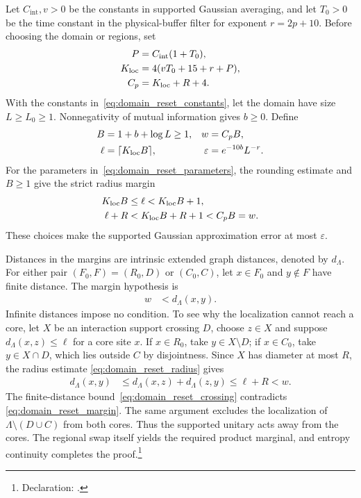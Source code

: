 \documentclass{article}
\begin{document}
Let $C_{\mathrm{int}},v>0$ be the constants in supported Gaussian averaging,
and let $T_0>0$ be the time constant in the physical-buffer filter for exponent
$r=2p+10$. Before choosing the domain or regions, set
\begin{align}
    P &= C_{\mathrm{int}}(1+T_0), \notag\\
    K_{\mathrm{loc}} &= 4(vT_0+15+r+P), \notag\\
    C_p &= K_{\mathrm{loc}}+R+4.
    \label{eq:domain_reset_constants}
\end{align}
With the constants in~\eqref{eq:domain_reset_constants}, let the domain have
size $L\ge L_0\ge1$. Nonnegativity of mutual information gives $b\ge0$. Define
\begin{align}
    B &= 1+b+\log L\ge1, & w &= C_p B, \notag\\
    \ell &= \lceil K_{\mathrm{loc}}B\rceil,
    & \varepsilon &= e^{-10b}L^{-r}.
    \label{eq:domain_reset_parameters}
\end{align}
For the parameters in~\eqref{eq:domain_reset_parameters}, the rounding
estimate and $B\ge1$ give the strict radius margin
\begin{align}
    K_{\mathrm{loc}}B &\le\ell<K_{\mathrm{loc}}B+1, \notag\\
    \ell+R &<K_{\mathrm{loc}}B+R+1<C_p B=w.
    \label{eq:domain_reset_radius}
\end{align}
These choices make the supported Gaussian approximation error at most
$\varepsilon$.

Distances in the margins are intrinsic extended graph distances, denoted by
$d_\Lambda$. For either pair $(F_0,F)=(R_0,D)$ or $(C_0,C)$, let $x\in F_0$
and $y\notin F$ have finite distance. The margin hypothesis is
\begin{align}
    w &<d_\Lambda(x,y).
    \label{eq:domain_reset_margin}
\end{align}
Infinite distances impose no condition. To see why the localization cannot
reach a core, let $X$ be an interaction support crossing $D$, choose $z\in X$
and suppose $d_\Lambda(x,z)\le\ell$ for a core site $x$. If $x\in R_0$, take
$y\in X\setminus D$; if $x\in C_0$, take $y\in X\cap D$, which lies outside
$C$ by disjointness. Since $X$ has diameter at most $R$, the radius estimate
\eqref{eq:domain_reset_radius} gives
\begin{align}
    d_\Lambda(x,y)
    &\le d_\Lambda(x,z)+d_\Lambda(z,y)
    \le\ell+R<w.
    \label{eq:domain_reset_crossing}
\end{align}
The finite-distance bound~\eqref{eq:domain_reset_crossing} contradicts
\eqref{eq:domain_reset_margin}. The same argument excludes the localization
of $\Lambda\setminus(D\cup C)$ from both cores. Thus the supported unitary
acts away from the cores. The regional swap itself yields the required
product marginal, and entropy continuity completes the proof.\footnote{
    Declaration: .}
\end{document}

